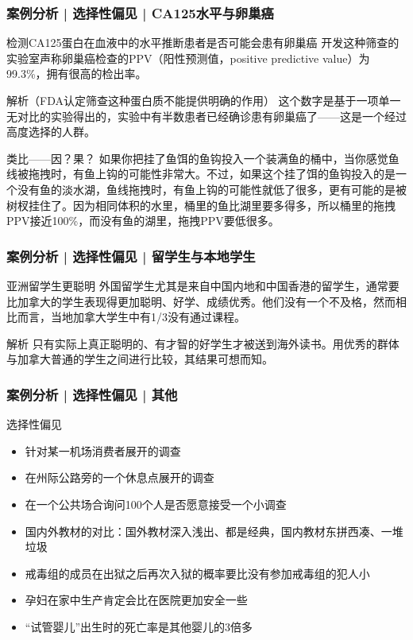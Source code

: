\begin{frame}
  \frametitle{案例分析 | 选择性偏见 | CA125水平与卵巢癌}
  \begin{block}{检测CA125蛋白在血液中的水平推断患者是否可能会患有卵巢癌}
    开发这种筛查的实验室声称卵巢癌检查的PPV（阳性预测值，positive predictive value）为99.3\%，拥有很高的检出率。
  \end{block}
  \pause
  \vspace{-0.3em}
  \begin{block}{解析（FDA认定筛查这种蛋白质不能提供明确的作用）}
    这个数字是基于一项单一无对比的实验得出的，实验中有半数患者已经确诊患有卵巢癌了——这是一个经过高度选择的人群。
  \end{block}
  \pause
  \vspace{-0.3em}
  \begin{block}{类比——因？果？}
    如果你把挂了鱼饵的鱼钩投入一个装满鱼的桶中，当你感觉鱼线被拖拽时，有鱼上钩的可能性非常大。不过，如果这个挂了饵的鱼钩投入的是一个没有鱼的淡水湖，鱼线拖拽时，有鱼上钩的可能性就低了很多，更有可能的是被树杈挂住了。因为相同体积的水里，桶里的鱼比湖里要多得多，所以桶里的拖拽PPV接近100\%，而没有鱼的湖里，拖拽PPV要低很多。
  \end{block}
\end{frame}

\begin{frame}
  \frametitle{案例分析 | 选择性偏见 | 留学生与本地学生}
  \begin{block}{亚洲留学生更聪明}
    外国留学生尤其是来自中国内地和中国香港的留学生，通常要比加拿大的学生表现得更加聪明、好学、成绩优秀。他们没有一个不及格，然而相比而言，当地加拿大学生中有1/3没有通过课程。
  \end{block}
  \pause
  \begin{block}{解析}
    只有实际上真正聪明的、有才智的好学生才被送到海外读书。用优秀的群体与加拿大普通的学生之间进行比较，其结果可想而知。
  \end{block}
\end{frame}

\begin{frame}
  \frametitle{案例分析 | 选择性偏见 | 其他}
  \begin{block}{选择性偏见}
    \begin{itemize}
      \item 针对某一机场消费者展开的调查
      \item 在州际公路旁的一个休息点展开的调查
      \item 在一个公共场合询问100个人是否愿意接受一个小调查
      \item 国内外教材的对比：国外教材深入浅出、都是经典，国内教材东拼西凑、一堆垃圾
      \item 戒毒组的成员在出狱之后再次入狱的概率要比没有参加戒毒组的犯人小
      \item 孕妇在家中生产肯定会比在医院更加安全一些
      \item “试管婴儿”出生时的死亡率是其他婴儿的3倍多
    \end{itemize}
  \end{block}
\end{frame}

